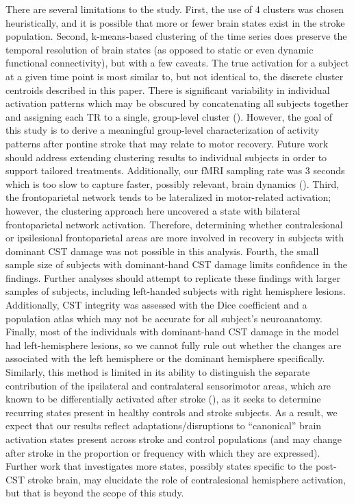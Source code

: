 \documentclass[phd,tocprelim]{cornell}
\begin{document}
    There are several limitations to the study. First, the use of 4 clusters was chosen heuristically, and it is possible that more or fewer brain states exist in the stroke population. Second, k-means-based clustering of the time series does preserve the temporal resolution of brain states (as opposed to static or even dynamic functional connectivity), but with a few caveats. The true activation for a subject at a given time point is most similar to, but not identical to, the discrete cluster centroids described in this paper. There is significant variability in individual activation patterns which may be obscured by concatenating all subjects together and assigning each TR to a single, group-level cluster (\cite{Betzel2021-ve}). However, the goal of this study is to derive a meaningful group-level characterization of activity patterns after pontine stroke that may relate to motor recovery. Future work should address extending clustering results to individual subjects in order to support tailored treatments. Additionally, our fMRI sampling rate was 3 seconds which is too slow to capture faster, possibly relevant, brain dynamics  (\cite{Kobeleva2021-nv, Baker2014-zt}). Third, the frontoparietal network tends to be lateralized in motor-related activation; however, the clustering approach here uncovered a state with bilateral frontoparietal network activation. Therefore, determining whether contralesional or ipsilesional frontoparietal areas are more involved in recovery in subjects with dominant CST damage was not possible in this analysis. Fourth, the small sample size of subjects with dominant-hand CST damage limits confidence in the findings. Further analyses should attempt to replicate these findings with larger samples of subjects, including left-handed subjects with right hemisphere lesions. Additionally, CST integrity was assessed with the Dice coefficient and a population atlas which may not be accurate for all subject's neuroanatomy. Finally, most of the individuals with dominant-hand CST damage in the model had left-hemisphere lesions, so we cannot fully rule out whether the changes are associated with the left hemisphere or the dominant hemisphere specifically. Similarly, this method is limited in its ability to distinguish the separate contribution of the ipsilateral and contralateral sensorimotor areas, which are known to be differentially activated after stroke (\cite{Zemke2003-vs}), as it seeks to determine recurring states present in healthy controls and stroke subjects. As a result, we expect that our results reflect adaptations/disruptions to “canonical” brain activation states present across stroke and control populations (and may change after stroke in the proportion or frequency with which they are expressed). Further work that investigates more states, possibly states specific to the post-CST stroke brain, may elucidate the role of contralesional hemisphere activation, but that is beyond the scope of this study. 
    
\end{document}
